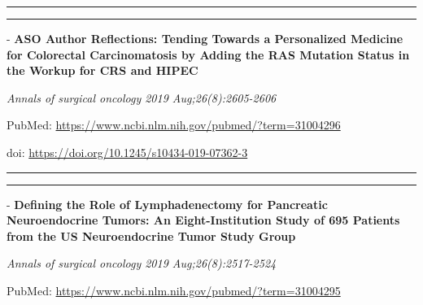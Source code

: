 \documentclass[]{article}
\begin{document}
{}

{}

\begin{center}\rule{0.5\linewidth}{\linethickness}\end{center}

\begin{center}\rule{0.5\linewidth}{\linethickness}\end{center}

 - \textbf{ASO Author Reflections: Tending Towards a Personalized
Medicine for Colorectal Carcinomatosis by Adding the RAS Mutation Status
in the Workup for CRS and HIPEC}

\emph{Annals of surgical oncology 2019 Aug;26(8):2605-2606}

PubMed: \url{https://www.ncbi.nlm.nih.gov/pubmed/?term=31004296}

doi: \url{https://doi.org/10.1245/s10434-019-07362-3}

{}

{}

\begin{center}\rule{0.5\linewidth}{\linethickness}\end{center}

\begin{center}\rule{0.5\linewidth}{\linethickness}\end{center}

 - \textbf{Defining the Role of Lymphadenectomy for Pancreatic
Neuroendocrine Tumors: An Eight-Institution Study of 695 Patients from
the US Neuroendocrine Tumor Study Group}

\emph{Annals of surgical oncology 2019 Aug;26(8):2517-2524}

PubMed: \url{https://www.ncbi.nlm.nih.gov/pubmed/?term=31004295}
\end{document}
